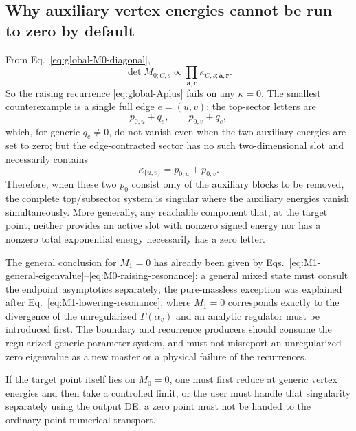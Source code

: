 \documentclass[11pt,a4paper]{article}
\begin{document}
\subsection{Why auxiliary vertex energies cannot be run to zero by default}

From Eq.~\eqref{eq:global-M0-diagonal},
\begin{equation}
 \det M_{0;C,s}\propto
 \prod_{\bm a,\bm r}\kappa_{C,s;\bm a,\bm r}.
 \label{eq:M0-determinant-letters}
\end{equation}
So the raising recurrence \eqref{eq:global-Aplus} fails on any $\kappa=0$. The smallest counterexample is a single full edge $e=(u,v)$: the top-sector letters are
\begin{equation}
 p_{0,u}\pm q_e,
 \qquad
 p_{0,v}\pm q_e,
 \end{equation}
which, for generic $q_e\neq0$, do not vanish even when the two auxiliary energies are set to zero; but the edge-contracted sector has no such two-dimensional slot and necessarily contains
\begin{equation}
 \kappa_{\{u,v\}}=p_{0,u}+p_{0,v}.
 \label{eq:contracted-zero-letter}
\end{equation}
Therefore, when these two $p_0$ consist only of the auxiliary blocks to be removed, the complete top/subsector system is singular where the auxiliary energies vanish simultaneously. More generally, any reachable component that, at the target point, neither provides an active slot with nonzero signed energy nor has a nonzero total exponential energy necessarily has a zero letter.

The general conclusion for $M_1=0$ has already been given by Eqs.~\eqref{eq:M1-general-eigenvalue}--\eqref{eq:M0-raising-resonance}: a general mixed state must consult the endpoint asymptotics separately; the pure-massless exception was explained after Eq.~\eqref{eq:M1-lowering-resonance}, where $M_1=0$ corresponds exactly to the divergence of the unregularized $\Gamma(\alpha_v)$ and an analytic regulator must be introduced first. The boundary and recurrence producers should consume the regularized generic parameter system, and must not misreport an unregularized zero eigenvalue as a new master or a physical failure of the recurrences.

If the target point itself lies on $M_0=0$, one must first reduce at generic vertex energies and then take a controlled limit, or the user must handle that singularity separately using the output DE; a zero point must not be handed to the ordinary-point numerical transport.
\end{document}
